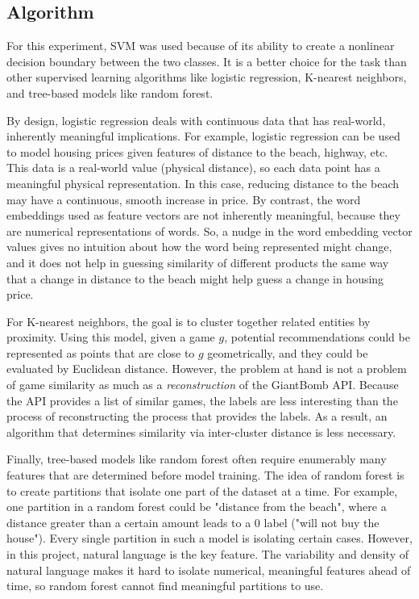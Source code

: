 \documentclass[10pt,twocolumn]{article}
\begin{document}
\subsection{Algorithm}
For this experiment, SVM was used because of its ability to create a nonlinear decision boundary between the two classes. \cite{CortesVapnikSVM} It is a better choice for the task than other supervised learning algorithms like logistic regression, K-nearest neighbors, and tree-based models like random forest. 

By design, logistic regression deals with continuous data that has real-world, inherently meaningful implications. For example, logistic regression can be used to model housing prices given features of distance to the beach, highway, etc. This data is a real-world value (physical distance), so each data point has a meaningful physical representation. In this case, reducing distance to the beach may have a continuous, smooth increase in price. By contrast, the word embeddings used as feature vectors are not inherently meaningful, because they are numerical representations of words. So, a nudge in the word embedding vector values gives no intuition about how the word being represented might change, and it does not help in guessing similarity of different products the same way that a change in distance to the beach might help guess a change in housing price.

For K-nearest neighbors, the goal is to cluster together related entities by proximity. Using this model, given a game $g$, potential recommendations could be represented as points that are close to $g$ geometrically, and they could be evaluated by Euclidean distance. However, the problem at hand is not a problem of game similarity as much as a \textit{reconstruction} of the GiantBomb API. Because the API provides a list of similar games, the labels are less interesting than the process of reconstructing the process that provides the labels. As a result, an algorithm that determines similarity via inter-cluster distance is less necessary.

Finally, tree-based models like random forest often require enumerably many features that are determined before model training. The idea of random forest is to create partitions that isolate one part of the dataset at a time. For example, one partition in a random forest could be "distance from the beach", where a distance greater than a certain amount leads to a 0 label ("will not buy the house"). Every single partition in such a model is isolating certain cases. However, in this project, natural language is the key feature. The variability and density of natural language makes it hard to isolate numerical, meaningful features ahead of time, so random forest cannot find meaningful partitions to use.
\end{document}
